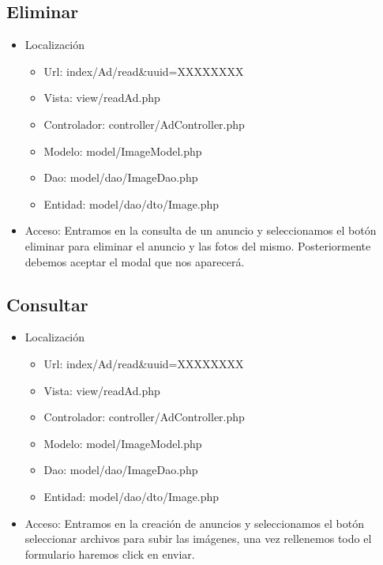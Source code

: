 \subsection{Eliminar}
\begin{itemize}
\item Localizaci\'{o}n
\begin{itemize}
\item Url: index/Ad/read\&uuid=XXXXXXXX
\item Vista: view/readAd.php
\item Controlador: controller/AdController.php
\item Modelo: model/ImageModel.php
\item Dao: model/dao/ImageDao.php
\item Entidad: model/dao/dto/Image.php
\end{itemize}
\item Acceso: Entramos en la consulta de un anuncio y seleccionamos el bot\'{o}n eliminar para eliminar el anuncio y las fotos del mismo. Posteriormente debemos aceptar el modal que nos aparecer\'{a}.
\end{itemize}

\subsection{Consultar}
\begin{itemize}
\item Localizaci\'{o}n
\begin{itemize}
\item Url: index/Ad/read\&uuid=XXXXXXXX
\item Vista: view/readAd.php
\item Controlador: controller/AdController.php
\item Modelo: model/ImageModel.php
\item Dao: model/dao/ImageDao.php
\item Entidad: model/dao/dto/Image.php
\end{itemize}
\item Acceso: Entramos en la creaci\'{o}n de anuncios y seleccionamos el bot\'{o}n seleccionar archivos para subir las im\'{a}genes, una vez rellenemos todo el formulario haremos click en enviar.
\end{itemize}